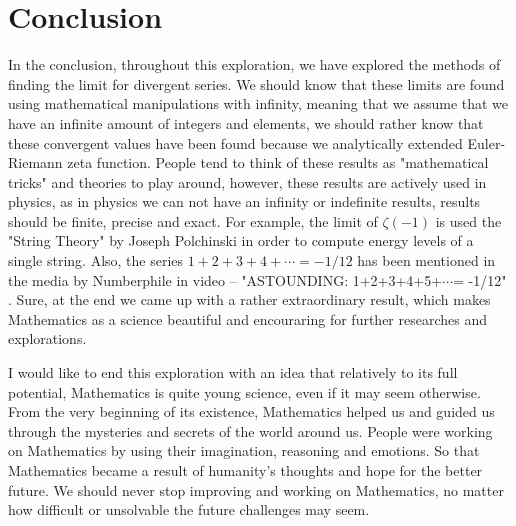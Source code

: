 \documentclass[11pt]{article}
\begin{document}
\section{Conclusion}
\label{sec:org3301a14}

In the conclusion, throughout this exploration, we have explored the methods of
finding the limit for divergent series. We should know that these limits are
found using mathematical manipulations with infinity, meaning that we assume
that we have an infinite amount of integers and elements, we should rather know
that these convergent values have been found because we analytically extended
Euler-Riemann zeta function. People tend to think of these results as
"mathematical tricks" and theories to play around, however, these results are
actively used in physics, as in physics we can not have an infinity or
indefinite results, results should be finite, precise and exact. For example,
the limit of \(\zeta(-1)\) is used the "String Theory" by Joseph Polchinski
\cite{String} in order to compute energy levels of a single string. Also, the
series \(1+2+3+4+\cdots=-1/12\) has been mentioned in the media by Numberphile in
video – "ASTOUNDING: 1+2+3+4+5+\(\cdots{}\)= -1/12" \cite{Numberphile}. Sure, at the end
we came up with a rather extraordinary result, which makes Mathematics as a
science beautiful and encouraring for further researches and explorations.  

I would like to end this exploration with
an idea that relatively to its full potential, Mathematics is quite young
science, even if it may seem otherwise. From the very beginning of its
existence, Mathematics helped us and guided us through the mysteries and secrets
of the world around us. People were working on Mathematics by using their
imagination, reasoning and emotions. So that Mathematics became a result of
humanity's thoughts and hope for the better future. We should never stop
improving and working on Mathematics, no matter how difficult or unsolvable the
future challenges may seem. 



\end{document}
